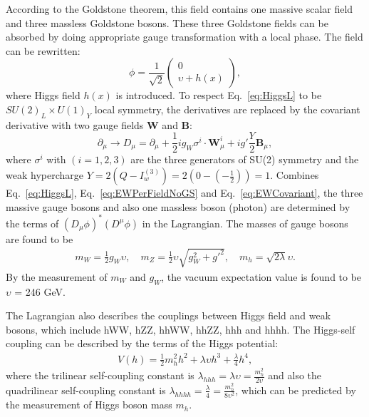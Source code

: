 According to the Goldstone theorem, this field contains one massive scalar field and three massless Goldstone bosons.
These three Goldstone fields can be absorbed by doing appropriate gauge transformation with a local phase.
The field can be rewritten:
\begin{equation} \label{eq:EWPerFieldNoGS}
  \phi = \frac{1}{\sqrt{2}}
  \begin{pmatrix}
	0 \\
	\upsilon+h(x)
  \end{pmatrix},
\end{equation}
where Higgs field $h(x)$ is introduced.
To respect Eq.~\ref{eq:HiggsL} to be $SU(2)_{L}\times U(1)_{Y}$ local symmetry, the derivatives are replaced by the covariant derivative with two gauge fields $\textbf{W}$ and $\textbf{B}$:
\begin{equation} \label{eq:EWCovariant}
  \partial_{\mu} \rightarrow D_{\mu}=\partial_{\mu}+\frac{1}{2}ig_{W}\sigma^i \cdot \textbf{W}_{\mu}^i + ig'\frac{Y}{2}\textbf{B}_{\mu},
\end{equation}
where $\sigma^i$ with $(i=1,2,3)$ are the three generators of SU(2) symmetry and the weak hypercharge $Y=2(Q-I_{w}^{(3)})=2(0-(-\frac{1}{2}))=1$.
Combines Eq.~\ref{eq:HiggsL}, Eq.~\ref{eq:EWPerFieldNoGS} and Eq.~\ref{eq:EWCovariant}, the three massive gauge bosons and also one massless boson (photon) are determined by the terms of $(D_{\mu}\phi)^{*}(D^{\mu}\phi)$ in the Lagrangian.
The masses of gauge bosons are found to be
\begin{equation} \label{eq:GaugeMass}
  \begin{aligned}
	m_{W}=\frac{1}{2}g_{W}\upsilon , \quad m_{Z}=\frac{1}{2}\upsilon\sqrt{g_{W}^{2}+g'^{2}}, \quad m_{h}=\sqrt{2\lambda}\upsilon .
  \end{aligned}
\end{equation}
By the measurement of $m_{W}$ and $g_{W}$, the vacuum expectation value is found to be $\upsilon$ = 246 GeV.

The Lagrangian also describes the couplings between Higgs field and weak bosons, which include hWW, hZZ, hhWW, hhZZ, hhh and hhhh.
The Higgs-self coupling can be described by the terms of the Higgs potential:
\begin{equation} \label{eq:HiggsCouplingTerms}
  \begin{aligned}
	V(h)=\frac{1}{2}m_{h}^{2}h^{2}+\lambda\upsilon h^{3}+\frac{\lambda}{4} h^{4}, %
  \end{aligned}
\end{equation}
where the trilinear self-coupling constant is $\lambda_{hhh}=\lambda \upsilon=\frac{m_{h}^2}{2\upsilon}$ and also the quadrilinear self-coupling constant is $\lambda_{hhhh}=\frac{\lambda}{4}=\frac{m_{h}^2}{8\upsilon^{2}}$, which can be predicted by the measurement of Higgs boson mass $m_{h}$.

